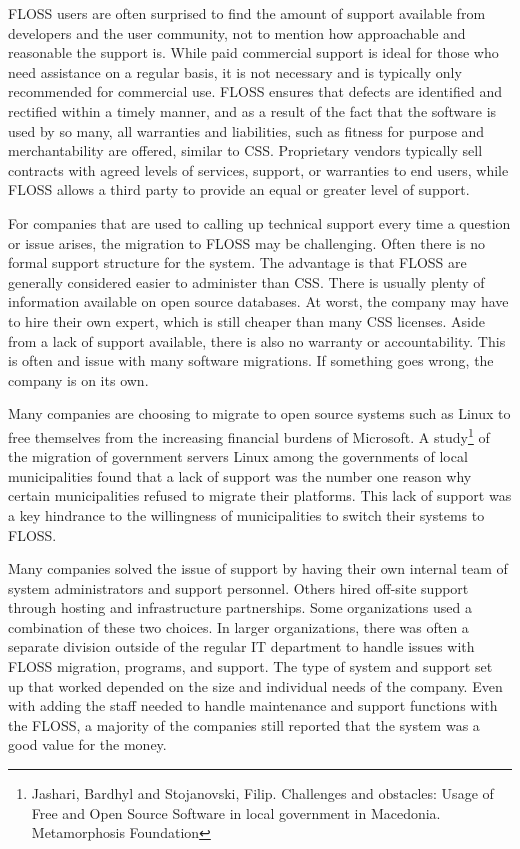  FLOSS users are often surprised to find the amount of support available from developers and the user community, not to mention how approachable and reasonable the support is. While paid commercial support is ideal for those who need assistance on a regular basis, it is not necessary and is typically only recommended for commercial use. FLOSS ensures that defects are identified and rectified within a timely manner, and as a result of the fact that the software is used by so many, all warranties and liabilities, such as fitness for purpose and merchantability are offered, similar to CSS.  Proprietary vendors typically sell contracts with agreed levels of services, support, or warranties to end users, while FLOSS allows a third party to provide an equal or greater level of support.




 For companies that are used to calling up technical support every time a question or issue arises, the migration to FLOSS may be challenging. Often there is no formal support structure for the system. The advantage is that FLOSS are generally considered easier to administer than CSS. There is usually plenty of information available on open source databases. At worst, the company may have to hire their own expert, which is still cheaper than many CSS licenses. Aside from a lack of support available, there is also no warranty or accountability. This is often and issue with many software migrations. If something goes wrong, the company is on its own. 

 Many companies are choosing to migrate to open source systems such as Linux to free themselves from the increasing financial burdens of Microsoft. A study\footnote{Jashari, Bardhyl and Stojanovski, Filip. Challenges and obstacles: Usage of Free and Open Source Software in local government in Macedonia. Metamorphosis Foundation\label{ftn:Macedonia}} of the migration of government servers Linux  among the governments of local municipalities found that a lack of support was the number one reason why certain municipalities refused to migrate their platforms. This lack of support was a key hindrance to the willingness of municipalities to switch their systems to FLOSS.

 Many companies solved the issue of support by having their own internal team of system administrators and support personnel. Others hired off-site support through hosting and infrastructure partnerships. Some organizations used a combination of these two choices. In larger organizations, there was often a separate division outside of the regular IT department to handle issues with FLOSS migration, programs, and support. The type of system and support set up that worked depended on the size and individual needs of the company.  Even with adding the staff needed to handle maintenance and support functions with the FLOSS, a majority of the companies still reported that the system was a good value for the money.

